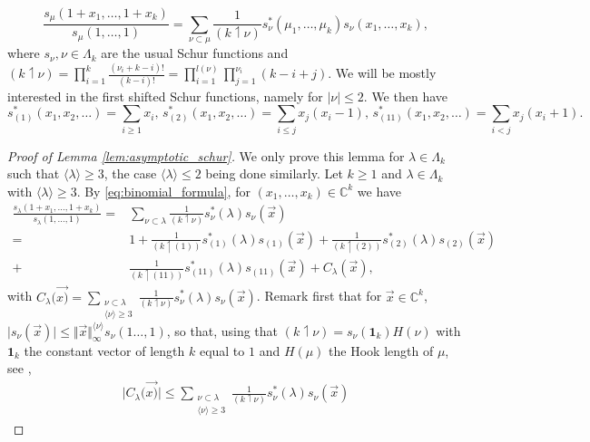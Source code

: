 \documentclass[10pt,11pt]{amsart}%
\begin{document}
\begin{equation}\label{eq:binomial_formula}
\frac{s_{\mu}(1+x_1,\ldots,1+x_k)}{s_{\mu}(1,\ldots,1)}=\sum_{\nu \subset \mu}\frac{1}{(k\upharpoonleft \nu)}s_{\nu}^*(\mu_1,\ldots,\mu_k)s_{\nu}(x_1,\ldots,x_k),
\end{equation}
where $s_{\nu}, \nu\in \Lambda_{k}$ are the usual Schur functions and $(k\upharpoonleft \nu)=\prod_{i=1}^k\frac{(\nu_i+k-i)!}{(k-i)!}=\prod_{i=1}^{l(\nu)}\prod_{j=1}^{\nu_i}(k-i+j)$. We will be mostly interested in the first shifted Schur functions, namely for $\vert\nu\vert\leq 2$. We then have 
$$s^*_{(1)}(x_{1},x_2,\ldots)=\sum_{i\geq 1}x_i,\, s^*_{(2)}(x_{1},x_2,\ldots)=\sum_{i\leq j}x_j(x_i-1),\, s^*_{(11)}(x_{1},x_2,\ldots)=\sum_{i<j}x_j(x_i+1).$$


\begin{proof}[Proof of Lemma \ref{lem:asymptotic_schur}]
We only prove this lemma for $\lambda\in \Lambda_{k}$ such that $\langle \lambda\rangle\geq 3$, the case $\langle \lambda\rangle\leq 2$ being done similarly. Let $k\geq 1$ and $\lambda\in \Lambda_{k}$ with $\langle \lambda\rangle\geq 3$. By \eqref{eq:binomial_formula}, for $(x_1,\ldots,x_k)\in \mathbb{C}^k$ we have 
\begin{align}
\frac{s_{\lambda}(1+x_1,\ldots,1+x_k)}{s_{\lambda}(1,\ldots,1)}=&\sum_{\nu \subset \lambda}\frac{1}{(k\upharpoonleft \nu)}s_{\nu}^*(\lambda)s_{\nu}(\vec{x})\nonumber\\
=&1+\frac{1}{(k\upharpoonleft (1))}s_{(1)}^*(\lambda)s_{(1)}(\vec{x})+\frac{1}{(k\upharpoonleft (2))}s_{(2)}^*(\lambda)s_{(2)}(\vec{x})\nonumber\\
+&\frac{1}{(k\upharpoonleft (11))}s_{(11)}^*(\lambda)s_{(11)}(\vec{x})+C_\lambda(\vec{x}) \label{eq:ratio_schur_first expansion},
\end{align}
with $C_\lambda(\vec{x)}=\sum_{\substack{\nu \subset \lambda\\\langle \nu\rangle \geq 3}}\frac{1}{(k\upharpoonleft \nu)}s_{\nu}^*(\lambda)s_{\nu}(\vec{x})$. Remark first that for $\vec{x}\in \mathbb{C}^k$, $\vert s_{\nu}(\vec{x})\vert \leq \Vert \vec{x}\Vert_{\infty}^{\langle \nu\rangle }s_{\nu}(1\ldots,1)$, so that, using that $ (k\upharpoonleft \nu)=s_{\nu}(\mathbf{1}_{k})H(\nu)$ with $\mathbf{1}_k$ the constant vector of length $k$ equal to $1$ and $H(\mu)$ the Hook length of $\mu$, see \cite[Eq. 5.5]{OkOl},
\begin{align}
\vert C_\lambda(\vec{x)}\vert \leq \sum_{\substack{\nu \subset \lambda\\\langle \nu\rangle \geq 3}}\frac{1}{(k\upharpoonleft \nu)}s_{\nu}^*(\lambda)s_{\nu}(\vec{x})

\end{align}
\end{proof}
\end{document}
